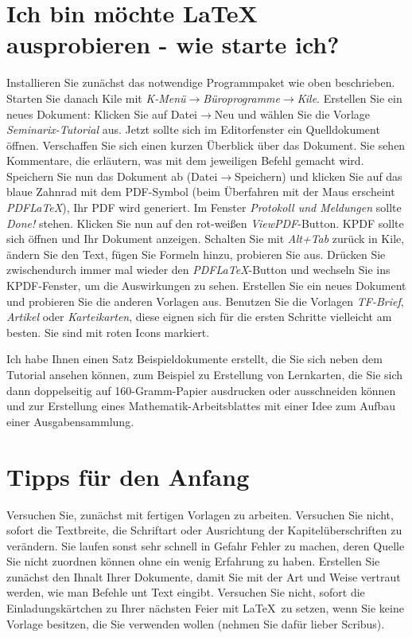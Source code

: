 \documentclass[a4paper,10pt]{scrartcl}
\begin{document}
\section*{Ich bin möchte \LaTeX \, ausprobieren - wie starte ich?}
Installieren Sie zunächst das notwendige Programmpaket wie oben beschrieben. Starten Sie danach Kile mit \emph{K-Menü$\rightarrow$Büroprogramme$\rightarrow$Kile}. Erstellen Sie ein neues Dokument: Klicken Sie auf Datei$\rightarrow$Neu und wählen Sie die Vorlage \emph{Seminarix-Tutorial} aus. Jetzt sollte sich im Editorfenster ein Quelldokument öffnen. Verschaffen Sie sich einen kurzen Überblick über das Dokument. Sie sehen Kommentare, die erläutern, was mit dem jeweiligen Befehl gemacht wird. Speichern Sie nun das Dokument ab (Datei$\rightarrow$Speichern) und klicken Sie auf das blaue Zahnrad mit dem PDF-Symbol (beim Überfahren mit der Maus erscheint \emph{PDFLaTeX}), Ihr PDF wird generiert. Im Fenster \emph{Protokoll und Meldungen} sollte \emph{Done!} stehen. Klicken Sie nun auf den rot-weißen \emph{ViewPDF}-Button. KPDF sollte sich öffnen und Ihr Dokument anzeigen. Schalten Sie mit \emph{Alt+Tab} zurück in Kile, ändern Sie den Text, fügen Sie Formeln hinzu, probieren Sie aus. Drücken Sie zwischendurch immer mal wieder den \emph{PDFLaTeX}-Button und wechseln Sie ins KPDF-Fenster, um die Auswirkungen zu sehen. Erstellen Sie ein neues Dokument und probieren Sie die anderen Vorlagen aus. Benutzen Sie die Vorlagen \textit{TF-Brief}, \textit{Artikel} oder \textit{Karteikarten}, diese eignen sich für die ersten Schritte vielleicht am besten. Sie sind mit roten Icons markiert.

Ich habe Ihnen einen Satz Beispieldokumente erstellt, die Sie sich neben dem Tutorial ansehen können, zum Beispiel zu Erstellung von Lernkarten, die Sie sich dann doppelseitig auf 160-Gramm-Papier ausdrucken oder ausschneiden können und zur Erstellung eines Mathematik-Arbeitsblattes mit einer Idee zum Aufbau einer Ausgabensammlung.

\section*{Tipps für den Anfang}
Versuchen Sie, zunächst mit fertigen Vorlagen zu arbeiten. Versuchen Sie nicht, sofort die Textbreite, die Schriftart oder Ausrichtung der Kapitelüberschriften zu verändern. Sie laufen sonst sehr schnell in Gefahr Fehler zu machen, deren Quelle Sie nicht zuordnen können ohne ein wenig Erfahrung zu haben. Erstellen Sie zunächst den Ihnalt Ihrer Dokumente, damit Sie mit der Art und Weise vertraut werden, wie man Befehle unt Text eingibt. Versuchen Sie nicht, sofort die Einladungskärtchen zu Ihrer nächsten Feier mit \LaTeX \, zu setzen, wenn Sie keine Vorlage besitzen, die Sie verwenden wollen (nehmen Sie dafür lieber Scribus).
\end{document}

